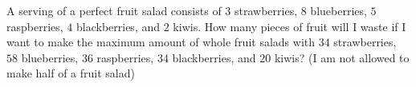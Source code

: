 A serving of a perfect fruit salad consists of $3$ strawberries, $8$ blueberries, $5$ raspberries, $4$ blackberries, and $2$ kiwis. How many pieces of fruit will I waste if I want to make the maximum amount of whole fruit salads with $34$ strawberries, $58$ blueberries, $36$ raspberries, $34$ blackberries, and $20$ kiwis? (I am not allowed to make half of a fruit salad)
